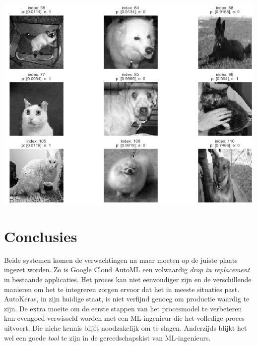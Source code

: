 \documentclass[a0,portrait]{a0poster}
\begin{document}
\begin{multicols}{2}
\begin{center}\vspace{1cm}
    \includegraphics[width=1\linewidth]{./figures/wrong.png}
    \label{fig:wrong}    
\end{center}




\color{HoGentAccent1} 
\section*{Conclusies}
\color{black}

Beide systemen komen de verwachtingen na maar moeten op de juiste plaats ingezet worden. Zo is Google Cloud AutoML een volwaardig \textit{drop in replacement} in bestaande applicaties. Het proces kan niet eenvoudiger zijn en de verschillende manieren om het te integreren zorgen ervoor dat het in meeste situaties past. AutoKeras, in zijn huidige staat, is niet verfijnd genoeg om productie waardig te zijn. De extra moeite om de eerste stappen van het procesmodel te verbeteren kan evengoed verwisseld worden met een ML-ingenieur die het volledige proces uitvoert. Die niche kennis blijft noodzakelijk om te slagen. Anderzijds blijkt het wel een goede \textit{tool} te zijn in de gereedschapskist van ML-ingenieurs.


\end{multicols}
\end{document}

